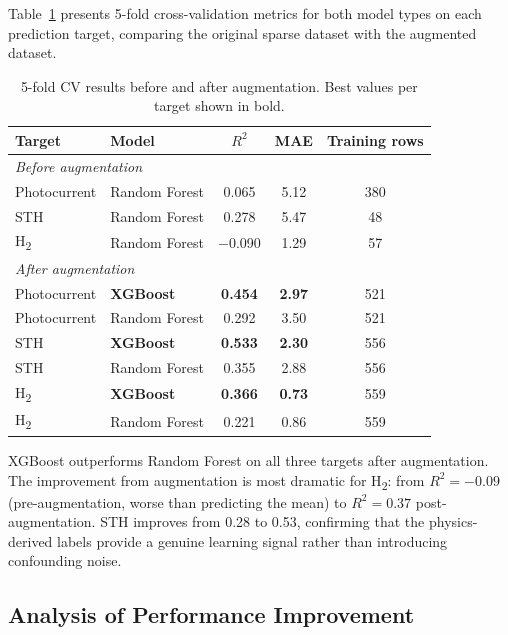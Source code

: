 Table~\ref{tab:cv_results} presents 5-fold cross-validation metrics for both
model types on each prediction target, comparing the original sparse dataset
with the augmented dataset.

\begin{table}[htb]
\centering
\caption{5-fold CV results before and after augmentation. Best values per target shown in bold.}
\label{tab:cv_results}
\begin{tabular}{llccc}
\toprule
Target & Model & $R^2$ & MAE & Training rows \\
\midrule
\multicolumn{5}{l}{\textit{Before augmentation}} \\
Photocurrent & Random Forest & 0.065 & 5.12 & 380 \\
STH          & Random Forest & 0.278 & 5.47 & 48  \\
H\textsubscript{2} & Random Forest & $-$0.090 & 1.29 & 57 \\
\midrule
\multicolumn{5}{l}{\textit{After augmentation}} \\
Photocurrent & \textbf{XGBoost}      & \textbf{0.454} & \textbf{2.97} & 521 \\
Photocurrent & Random Forest         & 0.292          & 3.50          & 521 \\
STH          & \textbf{XGBoost}      & \textbf{0.533} & \textbf{2.30} & 556 \\
STH          & Random Forest         & 0.355          & 2.88          & 556 \\
H\textsubscript{2} & \textbf{XGBoost} & \textbf{0.366} & \textbf{0.73} & 559 \\
H\textsubscript{2} & Random Forest    & 0.221          & 0.86          & 559 \\
\bottomrule
\end{tabular}
\end{table}

XGBoost outperforms Random Forest on all three targets after augmentation.
The improvement from augmentation is most dramatic for
H\textsubscript{2}: from $R^2 = -0.09$ (pre-augmentation, worse than predicting
the mean) to $R^2 = 0.37$ post-augmentation.
STH improves from 0.28 to 0.53, confirming that the physics-derived labels
provide a genuine learning signal rather than introducing confounding noise.

\subsection{Analysis of Performance Improvement}

